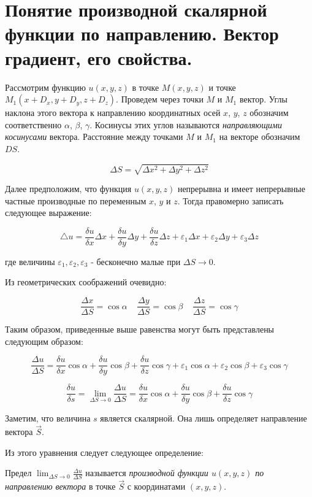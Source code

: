 \section{Понятие производной скалярной функции по направлению. Вектор градиент, его свойства.}

Рассмотрим функцию $u(x, y, z)$ в точке $M(x,y,z)$ и точке $M_1(x+D_x,y+D_y,z+D_z)$. 
Проведем через точки $M$ и $M_1$ вектор. Углы наклона этого вектора к направлению координатных осей $x$, $y$, $z$ обозначим соответственно $\alpha$, $\beta$, $\gamma$. 
Косинусы этих углов называются \textit{направляющими косинусами} вектора.
Расстояние между точками $M$ и $M_1$ на векторе обозначим $DS$.

$$\Delta{S}=\sqrt{\Delta{x^2}+\Delta{y^2}+\Delta{z^2}}$$

Далее предположим, что функция $u(x,y,z)$ непрерывна и имеет непрерывные частные производные по переменным $x$, $y$ и $z$. 
Тогда правомерно записать следующее выражение:

$$\triangle{u}=\frac{\delta{u}}{\delta{x}}\Delta{x}+\frac{\delta{u}}{\delta{y}}\Delta{y}+\frac{\delta{u}}{\delta{z}}\Delta{z}+\varepsilon_1\Delta{x}+\varepsilon_2\Delta{y}+\varepsilon_3\Delta{z}$$

где величины $\varepsilon_1,\varepsilon_2,\varepsilon_3$ - бесконечно малые при $\Delta{S}\rightarrow{0}$.

Из геометрических соображений очевидно:

$$\frac{\Delta{x}}{\Delta{S}}=\cos{\alpha}\;\;\;\;\frac{\Delta{y}}{\Delta{S}}=\cos{\beta}\;\;\;\;\frac{\Delta{z}}{\Delta{S}}=\cos{\gamma}$$

Таким образом, приведенные выше равенства могут быть представлены следующим образом:

$$\frac{\Delta{u}}{\Delta{S}}=\frac{\delta{u}}{\delta{x}}\cos{\alpha}+\frac{\delta{u}}{\delta{y}}\cos{\beta}+\frac{\delta{u}}{\delta{z}}\cos{\gamma}+\varepsilon_1\cos{\alpha}+\varepsilon_2\cos{\beta}+\varepsilon_3\cos{\gamma}$$

$$\frac{\delta{u}}{\delta{s}}=\lim_{\Delta{S}\to{0}}\frac{\Delta{u}}{\Delta{S}}=\frac{\delta{u}}{\delta{x}}\cos{\alpha}+\frac{\delta{u}}{\delta{y}}\cos{\beta}+\frac{\delta{u}}{\delta{z}}\cos{\gamma}$$

Заметим, что величина $s$ является скалярной. Она лишь определяет направление вектора $\vec{S}$.

Из этого уравнения следует следующее определение:

\begin{definition}
    Предел $\lim_{\Delta{S}\to{0}}\frac{\Delta{u}}{\Delta{S}}$ называется \textit{производной функции $u(x,y,z)$ по направлению вектора} 
    в точке $\vec{S}$ с координатами $(x,y,z)$.
\end{definition}

